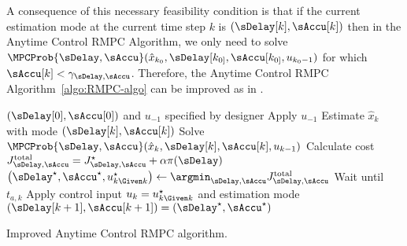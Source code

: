 A consequence of this necessary feasibility condition is that if the
current estimation mode at the current time step $k$ is $\left(\sDelay[k],\sAccu[k]\right)$
then in the Anytime Control RMPC Algorithm, we only need to solve
$\MPCProb{\sDelay,\sAccu}(\hat{x}_{k_{0}},\sDelay[k_{0]},\sAccu[k_{0]},u_{k_{0}-1})$
for which $\sAccu[k]<\gamma_{\sDelay,\sAccu}$. Therefore, the Anytime
Control RMPC Algorithm~\ref{algo:RMPC-algo} can be improved as in
.
\begin{algorithm}
\begin{algorithmic}[1]
\State $\left(\sDelay[0], \sAccu[0]\right)$ and $u_{-1}$ specified by designer
\State Apply $u_{-1}$
	\State Estimate $\hat{x}_{k}$ with mode $\left(\sDelay[k], \sAccu[k]\right)$
		\State Solve $\MPCProb{\sDelay,\sAccu}(\hat{x}_{k},\sDelay[k],\sAccu[k],u_{k-1})$
		\State Calculate cost $J_{\sDelay,\sAccu}^{\mathrm{total}} = J_{\sDelay,\sAccu}^{\star} + \alpha \pi(\sDelay)$
	\EndFor
	\State $\left( \sDelay^{\star}, \sAccu^{\star}, u_{k \Given k}^{\star} \right) \gets \argmin_{\sDelay,\sAccu} J_{\sDelay,\sAccu}^{\mathrm{total}}$
	\State Wait until $t_{a,k}$
	\State Apply control input $u_{k} = u_{k \Given k}^{\star}$ and estimation mode $\left( \sDelay[k+1], \sAccu[k+1] \right) = \left( \sDelay^{\star}, \sAccu^{\star} \right)$
\EndFor
\end{algorithmic} 

\caption{Improved Anytime Control RMPC algorithm.}
\label{algo:RMPC-algo-improved}
\end{algorithm}
